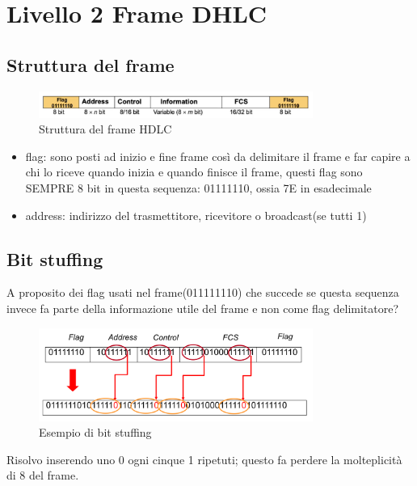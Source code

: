 \section{Livello 2 Frame DHLC}


\subsection{Struttura del frame}
\begin{figure}[h!]
    \centering
    \includegraphics[width=0.8\textwidth]{images/strutturaframe.png}
    \caption{Struttura del frame HDLC}
    \label{fig:struttura-frame}
\end{figure}
\begin{itemize}
    \item flag: sono posti ad inizio e fine frame così da delimitare il frame e far capire a chi lo riceve quando inizia e quando finisce il frame, questi flag sono SEMPRE 8 bit in questa sequenza: 
01111110, ossia 7E in esadecimale
        \item address: indirizzo del trasmettitore, ricevitore o broadcast(se tutti 1)

\end{itemize}

\subsection{Bit stuffing}
 A proposito dei flag usati nel frame(011111110) che succede se questa sequenza invece fa parte della informazione utile del frame e non come flag delimitatore?

\begin{figure}[h!]
    \centering
    \includegraphics[width=0.8\textwidth]{images/bitstuffing.png}
    \caption{Esempio di bit stuffing}
    \label{fig:bit-stuffing}
\end{figure}
Risolvo inserendo uno 0 ogni cinque 1 ripetuti; questo fa perdere la molteplicità di 8 del frame.

